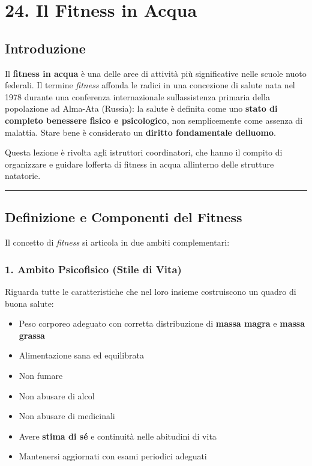 \documentclass[a4paper,11pt]{article}
\providecommand{\tightlist}{%
  \setlength{\itemsep}{0pt}\setlength{\parskip}{0pt}}
\begin{document}
\section{24. Il Fitness in Acqua}\label{il-fitness-in-acqua}

\subsection{Introduzione}\label{introduzione-23}

Il \textbf{fitness in acqua} è una delle aree di attività più
significative nelle scuole nuoto federali. Il termine \emph{fitness}
affonda le radici in una concezione di salute nata nel 1978 durante una
conferenza internazionale sull\textquotesingle assistenza primaria della
popolazione ad Alma-Ata (Russia): la salute è definita come uno
\textbf{stato di completo benessere fisico e psicologico}, non
semplicemente come assenza di malattia. Stare bene è considerato un
\textbf{diritto fondamentale dell\textquotesingle uomo}.

Questa lezione è rivolta agli istruttori coordinatori, che hanno il
compito di organizzare e guidare l\textquotesingle offerta di fitness in
acqua all\textquotesingle interno delle strutture natatorie.

\begin{center}\rule{0.5\linewidth}{0.5pt}\end{center}

\subsection{Definizione e Componenti del
      Fitness}\label{definizione-e-componenti-del-fitness}

Il concetto di \emph{fitness} si articola in due ambiti complementari:

\subsubsection{1. Ambito Psicofisico (Stile di
      Vita)}\label{ambito-psicofisico-stile-di-vita}

Riguarda tutte le caratteristiche che nel loro insieme costruiscono un
quadro di buona salute:

\begin{itemize}
      \tightlist
      \item
            Peso corporeo adeguato con corretta distribuzione di \textbf{massa
                  magra} e \textbf{massa grassa}
      \item
            Alimentazione sana ed equilibrata
      \item
            Non fumare
      \item
            Non abusare di alcol
      \item
            Non abusare di medicinali
      \item
            Avere \textbf{stima di sé} e continuità nelle abitudini di vita
      \item
            Mantenersi aggiornati con esami periodici adeguati
\end{itemize}
\end{document}
